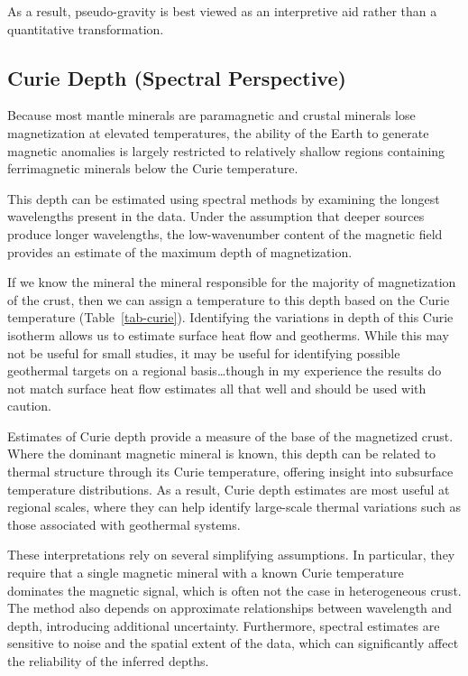 As a result, pseudo-gravity is best viewed as an interpretive aid rather than a quantitative transformation.

\subsection{Curie Depth (Spectral Perspective)}


Because most mantle minerals are paramagnetic and crustal minerals lose magnetization at elevated temperatures, the ability of the Earth to generate magnetic anomalies is largely restricted to relatively shallow regions containing ferrimagnetic minerals below the Curie temperature.

This depth can be estimated using spectral methods by examining the longest wavelengths present in the data. Under the assumption that deeper sources produce longer wavelengths, the low-wavenumber content of the magnetic field provides an estimate of the maximum depth of magnetization.

If we know the mineral the mineral responsible for the majority of magnetization of the crust, then we can assign a temperature to this depth based on the Curie temperature (Table~\ref{tab-curie}).  Identifying the variations in depth of this Curie isotherm allows us to estimate surface heat flow and geotherms.  While this may not be useful for small studies, it may be useful for identifying possible geothermal targets on a regional basis\ldots though in my experience the results do not match surface heat flow estimates all that well and should be used with caution.

Estimates of Curie depth provide a measure of the base of the magnetized crust. Where the dominant magnetic mineral is known, this depth can be related to thermal structure through its Curie temperature, offering insight into subsurface temperature distributions. As a result, Curie depth estimates are most useful at regional scales, where they can help identify large-scale thermal variations such as those associated with geothermal systems.

These interpretations rely on several simplifying assumptions. In particular, they require that a single magnetic mineral with a known Curie temperature dominates the magnetic signal, which is often not the case in heterogeneous crust. The method also depends on approximate relationships between wavelength and depth, introducing additional uncertainty. Furthermore, spectral estimates are sensitive to noise and the spatial extent of the data, which can significantly affect the reliability of the inferred depths.

